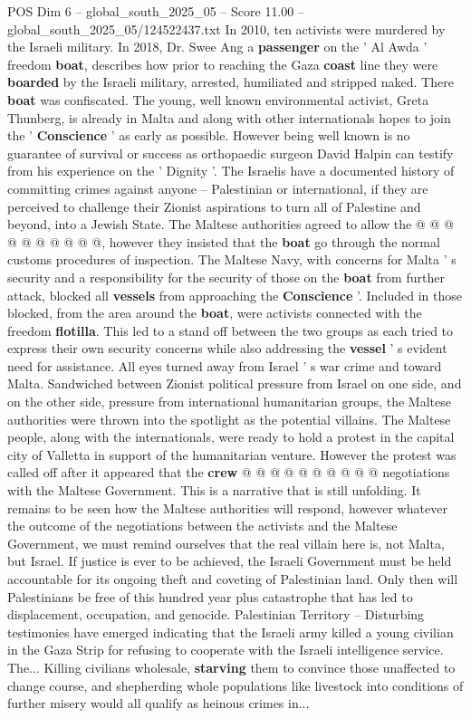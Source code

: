 \begin{textsample}{POS Dim 6 – global\_south\_2025\_05 – Score 11.00 – global\_south\_2025\_05/124522437.txt}
In 2010, ten activists were murdered by the Israeli military.
In 2018, Dr.
Swee Ang a \textbf{passenger} on the ' Al Awda ' freedom \textbf{boat}, describes how prior to reaching the Gaza \textbf{coast} line they were \textbf{boarded} by the Israeli military, arrested, humiliated and stripped naked.
There \textbf{boat} was confiscated.
The young, well known environmental activist, Greta Thunberg, is already in Malta and along with other internationals hopes to join the ' \textbf{Conscience} ' as early as possible.
However being well known is no guarantee of survival or success as orthopaedic surgeon David Halpin can testify from his experience on the ' Dignity '.
The Israelis have a documented history of committing crimes against anyone -- Palestinian or international, if they are perceived to challenge their Zionist aspirations to turn all of Palestine and beyond, into a Jewish State.
The Maltese authorities agreed to allow the @ @ @ @ @ @ @ @ @ @, however they insisted that the \textbf{boat} go through the normal customs procedures of inspection.
The Maltese Navy, with concerns for Malta ' s security and a responsibility for the security of those on the \textbf{boat} from further attack, blocked all \textbf{vessels} from approaching the \textbf{Conscience} '.
Included in those blocked, from the area around the \textbf{boat}, were activists connected with the freedom \textbf{flotilla}.
This led to a stand off between the two groups as each tried to express their own security concerns while also addressing the \textbf{vessel} ' s evident need for assistance.
All eyes turned away from Israel ' s war crime and toward Malta.
Sandwiched between Zionist political pressure from Israel on one side, and on the other side, pressure from international humanitarian groups, the Maltese authorities were thrown into the spotlight as the potential villains.
The Maltese people, along with the internationals, were ready to hold a protest in the capital city of Valletta in support of the humanitarian venture.
However the protest was called off after it appeared that the \textbf{crew} @ @ @ @ @ @ @ @ @ @ negotiations with the Maltese Government.
This is a narrative that is still unfolding.
It remains to be seen how the Maltese authorities will respond, however whatever the outcome of the negotiations between the activists and the Maltese Government, we must remind ourselves that the real villain here is, not Malta, but Israel.
If justice is ever to be achieved, the Israeli Government must be held accountable for its ongoing theft and coveting of Palestinian land.
Only then will Palestinians be free of this hundred year plus catastrophe that has led to displacement, occupation, and genocide.
Palestinian Territory -- Disturbing testimonies have emerged indicating that the Israeli army killed a young civilian in the Gaza Strip for refusing to cooperate with the Israeli intelligence service.
The...
Killing civilians wholesale, \textbf{starving} them to convince those unaffected to change course, and shepherding whole populations like livestock into conditions of further misery would all qualify as heinous crimes in...


\end{textsample}
